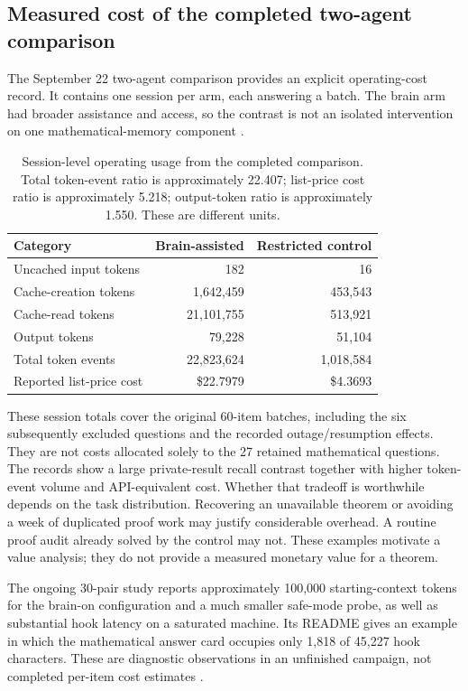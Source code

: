 \subsection{Measured cost of the completed two-agent comparison}

The September 22 two-agent comparison provides an explicit operating-cost record. It contains one session per arm, each answering a batch. The brain arm had broader assistance and access, so the contrast is not an isolated intervention on one mathematical-memory component \citep{twoopus,twoopususage}.

\begin{table}[htbp]
\centering\small
\begin{tabular}{lrr}
\toprule Category & Brain-assisted & Restricted control\\ \midrule
Uncached input tokens & 182 & 16\\
Cache-creation tokens & 1,642,459 & 453,543\\
Cache-read tokens & 21,101,755 & 513,921\\
Output tokens & 79,228 & 51,104\\
\midrule
Total token events & 22,823,624 & 1,018,584\\
Reported list-price cost & \$22.7979 & \$4.3693\\
\bottomrule
\end{tabular}
\caption{Session-level operating usage from the completed comparison. Total token-event ratio is approximately 22.407; list-price cost ratio is approximately 5.218; output-token ratio is approximately 1.550. These are different units.}
\label{tab:opcost}
\end{table}

These session totals cover the original 60-item batches, including the six subsequently excluded questions and the recorded outage/resumption effects. They are not costs allocated solely to the 27 retained mathematical questions. The records show a large private-result recall contrast together with higher token-event volume and API-equivalent cost. Whether that tradeoff is worthwhile depends on the task distribution. Recovering an unavailable theorem or avoiding a week of duplicated proof work may justify considerable overhead. A routine proof audit already solved by the control may not. These examples motivate a value analysis; they do not provide a measured monetary value for a theorem.

The ongoing 30-pair study reports approximately 100,000 starting-context tokens for the brain-on configuration and a much smaller safe-mode probe, as well as substantial hook latency on a saturated machine. Its README gives an example in which the mathematical answer card occupies only 1,818 of 45,227 hook characters. These are diagnostic observations in an unfinished campaign, not completed per-item cost estimates \citep{ab30readme,ab30prereg}.

